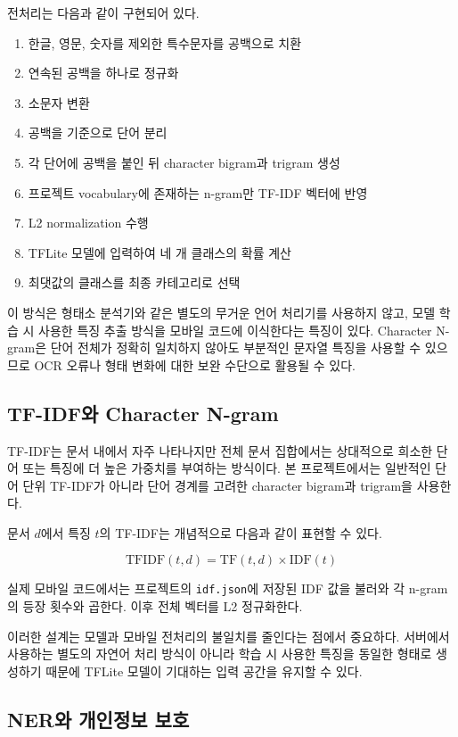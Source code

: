 \documentclass[11pt,a4paper]{article}
\begin{document}
전처리는 다음과 같이 구현되어 있다.

\begin{enumerate}
    \item 한글, 영문, 숫자를 제외한 특수문자를 공백으로 치환
    \item 연속된 공백을 하나로 정규화
    \item 소문자 변환
    \item 공백을 기준으로 단어 분리
    \item 각 단어에 공백을 붙인 뒤 character bigram과 trigram 생성
    \item 프로젝트 vocabulary에 존재하는 n-gram만 TF-IDF 벡터에 반영
    \item L2 normalization 수행
    \item TFLite 모델에 입력하여 네 개 클래스의 확률 계산
    \item 최댓값의 클래스를 최종 카테고리로 선택
\end{enumerate}

이 방식은 형태소 분석기와 같은 별도의 무거운 언어 처리기를 사용하지 않고, 모델 학습 시 사용한 특징 추출 방식을 모바일 코드에 이식한다는 특징이 있다. Character N-gram은 단어 전체가 정확히 일치하지 않아도 부분적인 문자열 특징을 사용할 수 있으므로 OCR 오류나 형태 변화에 대한 보완 수단으로 활용될 수 있다.

\subsection{TF-IDF와 Character N-gram}

TF-IDF는 문서 내에서 자주 나타나지만 전체 문서 집합에서는 상대적으로 희소한 단어 또는 특징에 더 높은 가중치를 부여하는 방식이다. 본 프로젝트에서는 일반적인 단어 단위 TF-IDF가 아니라 단어 경계를 고려한 character bigram과 trigram을 사용한다.

문서 $d$에서 특징 $t$의 TF-IDF는 개념적으로 다음과 같이 표현할 수 있다.

\[
\mathrm{TFIDF}(t,d)=\mathrm{TF}(t,d)\times \mathrm{IDF}(t)
\]

실제 모바일 코드에서는 프로젝트의 \texttt{idf.json}에 저장된 IDF 값을 불러와 각 n-gram의 등장 횟수와 곱한다. 이후 전체 벡터를 L2 정규화한다.

이러한 설계는 모델과 모바일 전처리의 불일치를 줄인다는 점에서 중요하다. 서버에서 사용하는 별도의 자연어 처리 방식이 아니라 학습 시 사용한 특징을 동일한 형태로 생성하기 때문에 TFLite 모델이 기대하는 입력 공간을 유지할 수 있다.

\subsection{NER와 개인정보 보호}
\end{document}
